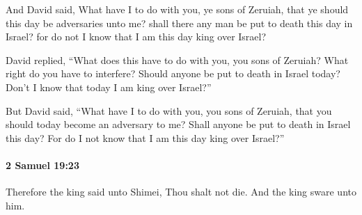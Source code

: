 			\begin{versebox}
					\item[BHS] 
					\item[ASV] And David said, What have I to do with you, ye sons of Zeruiah, that ye should this day be adversaries unto me? shall there any man be put to death this day in Israel? for do not I know that I am this day king over Israel?
					\item[NIV] David replied, “What does this have to do with you, you sons of Zeruiah? What right do you have to interfere? Should anyone be put to death in Israel today? Don’t I know that today I am king over Israel?”
					\item[NRSV] But David said, “What have I to do with you, you sons of Zeruiah, that you should today become an adversary to me? Shall anyone be put to death in Israel this day? For do I not know that I am this day king over Israel?”
			\end{versebox}

		\paragraph{2 Samuel 19:23} %
			\label{2SAMUEL-19-23}

			Therefore the king said unto Shimei, Thou shalt not die. And the king sware unto him.

